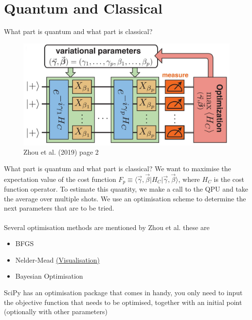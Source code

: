 \documentclass{beamer}
\begin{document}
\section{Quantum and Classical}
\begin{frame}{What part is quantum and what part is classical?}
	\begin{figure}
		\includegraphics[scale=0.3]{figures/qaoa_idea.JPG}
		\caption{Zhou et al. (2019) page 2}
	\end{figure}	
\end{frame}

\begin{frame}{What part is quantum and what part is classical?}
	We want to maximise the expectation value of the cost function $F_p \equiv \langle \vec{\gamma}, \vec{\beta}| H_C | \vec{\gamma}, \vec{\beta}\rangle$, where $H_C$ is the cost function operator. To estimate this quantity, we make a call to the QPU and take the average over multiple shots.
	We use an optimisation scheme to determine the next parameters that are to be tried. \\~\\ 
	Several optimisation methods are mentioned by Zhou et al. these are
	\begin{itemize}
		\item BFGS
		\item Nelder-Mead \href{https://www.youtube.com/watch?v=HUqLxHfxWqU}{(Visualisation)}
		\item Bayesian Optimisation
	\end{itemize}	

SciPy has an optimisation package that comes in handy, you only need to input the objective function that needs to be optimised, together with an initial point (optionally with other parameters)
\end{frame}
\end{document}
